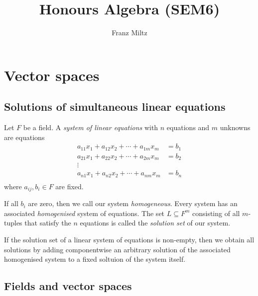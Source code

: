 \documentclass{article}
\begin{document}
\mkthmstwounified
\title{Honours Algebra (SEM6)}
\author{Franz Miltz}
\maketitle
\tableofcontents
\pagebreak

\section{Vector spaces}

\subsection{Solutions of simultaneous linear equations}

\begin{definition}
    Let $F$ be a field. A \emph{system of linear equations} with $n$ equations and
    $m$ unknowns are equations
    \begin{align*}
        a_{11}x_1 + a_{12}x_2 + \cdots + a_{1m}x_m & = b_1 \\
        a_{21}x_1 + a_{22}x_2 + \cdots + a_{2m}x_m & = b_2 \\
        \vdots                                             \\
        a_{n1}x_1 + a_{n2}x_2 + \cdots + a_{nm}x_m & = b_n \\
    \end{align*}
    where $a_{ij},b_i\in F$ are fixed.

    If all $b_i$ are zero, then we call our system \emph{homogeneous}. Every system
    has an associated \emph{homogenised} system of equations.
    The set $L\subseteq F^m$ consisting of all $m$-tuples that satisfy the
    $n$ equations is called the \emph{solution set} of our system.
\end{definition}

\begin{theorem}[Notes 1.1.4]
    If the solution set of a linear system of equations is non-empty, then we obtain
    all solutions by adding componentwise an arbitrary solution of the associated
    homogenised system to a fixed soltuion of the system itself.
\end{theorem}

\subsection{Fields and vector spaces}
\end{document}
